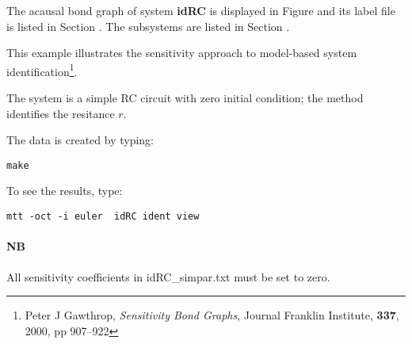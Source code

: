 

   The acausal bond graph of system \textbf{idRC} is
   displayed in Figure  and its label
   file is listed in Section .
   The subsystems are listed in Section .

   
   This example illustrates the sensitivity approach to model-based
   system identification\footnote{Peter J Gawthrop, \emph{Sensitivity
       Bond Graphs}, Journal Franklin Institute, \textbf{337}, 2000,
     pp 907--922}.

   The system is a simple RC circuit with zero initial condition; the
   method identifies the resitance $r$.

   The data is created by typing:
\begin{verbatim}
make
\end{verbatim}
To see the results, type: 
\begin{verbatim}
mtt -oct -i euler  idRC ident view
\end{verbatim}

   \paragraph{NB} All sensitivity coefficients in idRC_simpar.txt must
   be set to zero.